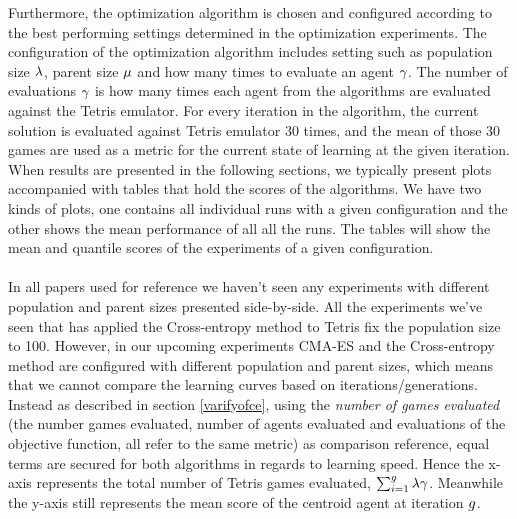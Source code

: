 Furthermore, the optimization algorithm is chosen and configured according to
the best performing settings determined in the optimization experiments. The
configuration of the optimization algorithm includes setting such as population size
$\lambda$, parent size $\mu$ and how many times
to evaluate an agent $\gamma$. The number of evaluations $\gamma$
is how many times each agent from the algorithms are evaluated against the 
Tetris emulator. For every iteration in the algorithm, the current solution is 
evaluated against Tetris emulator 30 times, and the mean of those 30 games are used as
a metric for the current state of learning at the given iteration. When results are presented 
in the following sections, we typically present plots accompanied with tables 
that hold the scores of the algorithms. We have two kinds of plots, one contains all
individual runs with a given configuration and the other shows the mean performance
of all all the runs. The tables will show the mean and quantile scores of the experiments
of a given configuration.\\
\\
In all papers used for reference we haven't seen any experiments with different population
and parent sizes presented side-by-side. All the experiments we've seen
that has applied the Cross-entropy method to Tetris fix the population size to 100. 
However, in our upcoming experiments
CMA-ES and the Cross-entropy method are configured with different population and parent sizes, which means
that we cannot compare the learning curves based on iterations/generations. Instead as described
in section \ref{varifyofce}, using the  
\textit{number of games evaluated} (the number games evaluated, number of agents evaluated and evaluations of the objective function, all refer to the same metric) as comparison reference, equal terms are secured for both algorithms 
in regards to learning speed.
Hence the x-axis represents the total number 
of Tetris games evaluated, 
$\sum_{i = 1}^{g} \lambda \gamma$. 
Meanwhile the y-axis still represents the mean score 
of the centroid agent at iteration $g$.\\














